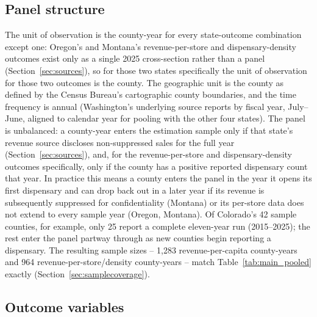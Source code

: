 \documentclass[12pt]{article}
\begin{document}
\subsection{Panel structure}
\label{sec:panelstructure}

The unit of observation is the county-year for every state-outcome combination except one: Oregon's and
Montana's revenue-per-store and dispensary-density outcomes exist only as a single 2025 cross-section rather
than a panel (Section~\ref{sec:sources}), so for those two states specifically the unit of observation for
those two outcomes is the county. The geographic unit is the county as defined by the Census Bureau's cartographic county boundaries, and the
time frequency is annual (Washington's underlying source reports by fiscal year, July--June, aligned to
calendar year for pooling with the other four states). The panel is unbalanced: a county-year enters the
estimation sample only if that state's revenue source discloses non-suppressed sales for the full year
(Section~\ref{sec:sources}), and, for the revenue-per-store and dispensary-density outcomes specifically, only
if the county has a positive reported dispensary count that year. In practice this means a county enters the
panel in the year it opens its first dispensary and can drop back out in a later year if its revenue is
subsequently suppressed for confidentiality (Montana) or its per-store data does not extend to every sample
year (Oregon, Montana). Of Colorado's 42 sample counties, for example, only 25 report a complete eleven-year
run (2015--2025); the rest enter the panel partway through as new counties begin reporting a dispensary. The
resulting sample sizes -- 1,283 revenue-per-capita county-years and 964 revenue-per-store/density
county-years -- match Table~\ref{tab:main_pooled} exactly (Section~\ref{sec:samplecoverage}).

\subsection{Outcome variables}
\label{sec:outcomevars}
\end{document}
